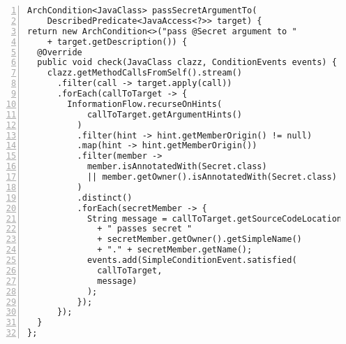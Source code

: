 \clearpage
\begin{lstlisting}[caption=Constraint 7: \texttt{passSecretArgumentTo} custom condition., captionpos=b, label=lst:constraint_7_condition, numbers=left, showstringspaces=false]
ArchCondition<JavaClass> passSecretArgumentTo(
    DescribedPredicate<JavaAccess<?>> target) {
return new ArchCondition<>("pass @Secret argument to "
    + target.getDescription()) {
  @Override
  public void check(JavaClass clazz, ConditionEvents events) {
    clazz.getMethodCallsFromSelf().stream()
      .filter(call -> target.apply(call))
      .forEach(callToTarget -> {
        InformationFlow.recurseOnHints(
            callToTarget.getArgumentHints()
          )
          .filter(hint -> hint.getMemberOrigin() != null)
          .map(hint -> hint.getMemberOrigin())
          .filter(member ->
            member.isAnnotatedWith(Secret.class)
            || member.getOwner().isAnnotatedWith(Secret.class)
          )
          .distinct()
          .forEach(secretMember -> {
            String message = callToTarget.getSourceCodeLocation()
              + " passes secret "
              + secretMember.getOwner().getSimpleName()
              + "." + secretMember.getName();
            events.add(SimpleConditionEvent.satisfied(
              callToTarget,
              message)
            );
          });
      });
  }
};
\end{lstlisting}


